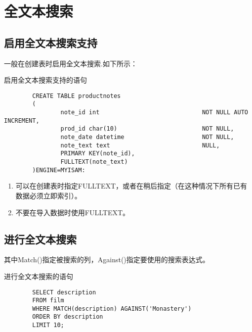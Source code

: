 \documentclass[UTF8]{article}
\begin{document}
\section{全文本搜索}
\subsection{启用全文本搜索支持}

一般在创建表时启用全文本搜索.如下所示：

\begin{listing}[H]
        \caption{启用全文本搜索支持的语句}
	\label{code:usefulltextclause}
\begin{verbatim}
        CREATE TABLE productnotes
        (
                note_id int                             NOT NULL AUTO INCREMENT,
                prod_id char(10)                        NOT NULL,
                note_date datetime                      NOT NULL,
                note_text text                          NULL,
                PRIMARY KEY(note_id),
                FULLTEXT(note_text)
        )ENGINE=MYISAM:
\end{verbatim}
\end{listing}

\begin{orangebox}[frametitle={Tips 18.1.1 FULLTEXT注意事项}]
        \begin{enumerate}
                \item 可以在创建表时指定FULLTEXT，或者在稍后指定（在这种情况下所有已有数据必须立即索引）。
                \item 不要在导入数据时使用FULLTEXT。
        \end{enumerate}
\end{orangebox}      


\subsection{进行全文本搜索}
其中Match()指定被搜索的列，Against()指定要使用的搜索表达式。

\begin{listing}[H]
        \caption{进行全文本搜索的语句}
	\label{code:fulltextselectclause}
\begin{verbatim}
        SELECT description 
        FROM film 
        WHERE MATCH(description) AGAINST('Monastery')
        ORDER BY description
        LIMIT 10; 
\end{verbatim}
\end{listing}
\end{document}
